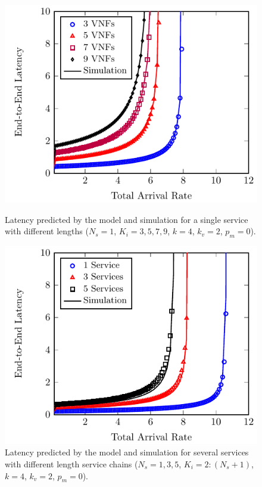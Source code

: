 \begin{figure}
	\vspace{2mm}

	\begin{minipage}[b]{.49\textwidth}
		\includegraphics[width=\linewidth]{graphs/diff_lengths}
		\caption{Latency predicted by the model and simulation for a single service with different lengths ($N_s=1$, $K_i={3,5,7,9}$, $k=4$, $k_v =2$, $p_m=0$).}
		\label{fig:length_chain}
	\end{minipage}
	\hfill
	\begin{minipage}[b]{.49\textwidth}
		\includegraphics[width=\linewidth]{graphs/mult_services}
		\caption{Latency predicted by the model and simulation for several services
		with different length service chains ($N_s={1,3,5}$, $K_i=2:(N_s+1)$, $k=4$, $k_v=2$, $p_m=0$).}
		\label{fig:mult_services}
	\end{minipage}

\end{figure}

